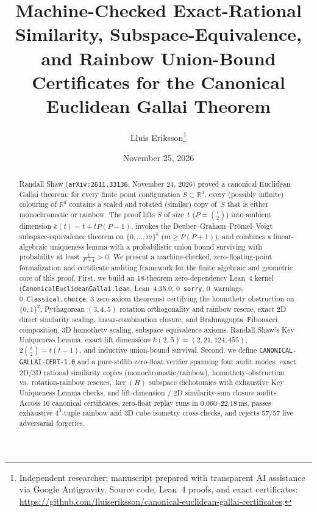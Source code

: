 \documentclass[11pt,twocolumn]{article}
\title{\textbf{Machine-Checked Exact-Rational Similarity, Subspace-Equivalence, and Rainbow Union-Bound Certificates for the Canonical Euclidean Gallai Theorem}}
\author{Lluis Eriksson\thanks{Independent researcher; manuscript prepared with transparent AI assistance via Google Antigravity. Source code, Lean~4 proofs, and exact certificates: \url{https://github.com/lluiseriksson/canonical-euclidean-gallai-certificates}.}}
\date{November 25, 2026}
\begin{document}
\maketitle

\begin{abstract}
Randall Shaw (\texttt{arXiv:2611.33136}, November 24, 2026) proved a canonical Euclidean Gallai theorem: for every finite point configuration $S \subset \mathbb{R}^d$, every (possibly infinite) colouring of $\mathbb{R}^d$ contains a scaled and rotated (similar) copy of~$S$ that is either monochromatic or rainbow. The proof lifts $S$ of size~$t$ ($P = \binom{t}{2}$) into ambient dimension $k(t) = t + tP(P-1)$, invokes the Deuber--Graham--Pr\"omel--Voigt subspace-equivalence theorem on $\{0,\dots,m\}^k$ ($m \ge P(P+1)$), and combines a linear-algebraic uniqueness lemma with a probabilistic union bound surviving with probability at least $\frac{1}{P+1} > 0$. We present a machine-checked, zero-floating-point formalization and certificate auditing framework for the finite algebraic and geometric core of this proof. First, we build an 18-theorem zero-dependency Lean~4 kernel (\texttt{CanonicalEuclideanGallai.lean}, Lean~4.35.0; 0~\texttt{sorry}, 0~warnings, 0~\texttt{Classical.choice}, 3 zero-axiom theorems) certifying the homothety obstruction on $\{0,1\}^2$, Pythagorean $(3,4,5)$ rotation orthogonality and rainbow rescue, exact 2D direct similarity scaling, linear-combination closure, and Brahmagupta--Fibonacci composition, 3D homothety scaling, subspace equivalence axioms, Randall Shaw's Key Uniqueness Lemma, exact lift dimensions $k(2..5) = (2,21,124,455)$, $2\binom{t}{2} = t(t-1)$, and inductive union-bound survival. Second, we define \texttt{CANONICAL-GALLAI-CERT-1.0} and a pure-stdlib zero-float verifier spanning four audit modes: exact 2D/3D rational similarity copies (monochromatic/rainbow), homothety-obstruction vs.\ rotation-rainbow rescues, $\ker(H)$ subspace dichotomies with exhaustive Key Uniqueness Lemma checks, and lift-dimension / 2D similarity-sum closure audits. Across 16 canonical certificates, zero-float replay runs in $0.060$--$22.18\,\mathrm{ms}$, passes exhaustive $4^3$-tuple rainbow and 3D cube isometry cross-checks, and rejects 57/57 live adversarial forgeries.
\end{abstract}
\end{document}
